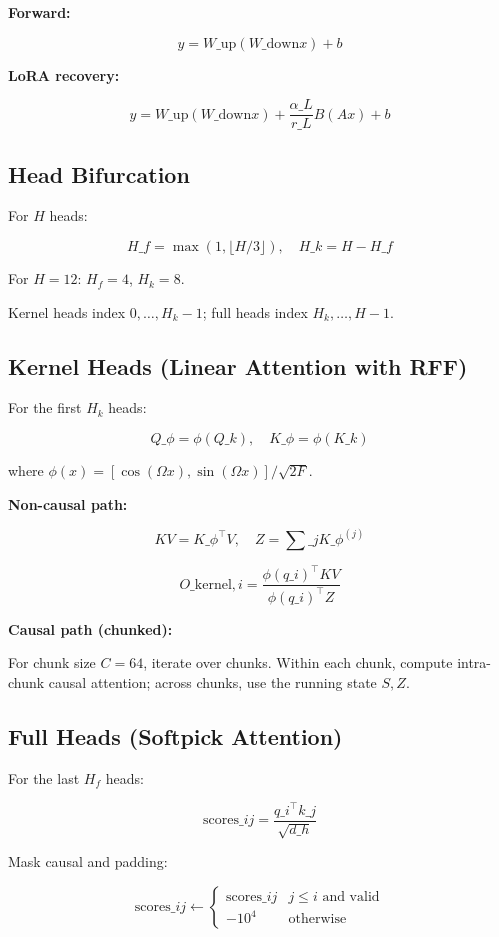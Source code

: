\textbf{Forward:}

\[
y = W\_\text{up}(W\_\text{down} x) + b
\tag{4.1}
\]

\textbf{LoRA recovery:}

\[
y = W\_\text{up}(W\_\text{down} x) + \frac{\alpha\_L}{r\_L} B(A x) + b
\tag{4.2}
\]

\subsection{Head Bifurcation}

For $H$ heads:

\[
H\_f = \max(1, \lfloor H / 3 \rfloor), \quad H\_k = H - H\_f
\tag{4.3}
\]

For $H = 12$: $H_f = 4$, $H_k = 8$.

Kernel heads index $0, \ldots, H_k - 1$; full heads index $H_k, \ldots, H - 1$.

\subsection{Kernel Heads (Linear Attention with RFF)}

For the first $H_k$ heads:

\[
Q\_\phi = \phi(Q\_k), \quad K\_\phi = \phi(K\_k)
\tag{4.4}
\]

where $\phi(x) = [\cos(\Omega x), \sin(\Omega x)] / \sqrt{2F}$.

\textbf{Non-causal path:}

\[
KV = K\_\phi^\top V, \quad Z = \sum\_j K\_\phi^{(j)}
\tag{4.5}
\]

\[
O\_{\text{kernel}, i} = \frac{\phi(q\_i)^\top KV}{\phi(q\_i)^\top Z}
\tag{4.6}
\]

\textbf{Causal path (chunked):}

For chunk size $C = 64$, iterate over chunks. Within each chunk, compute 
intra-chunk causal attention; across chunks, use the running state $S, Z$.

\subsection{Full Heads (Softpick Attention)}

For the last $H_f$ heads:

\[
\text{scores}\_{ij} = \frac{q\_i^\top k\_j}{\sqrt{d\_h}}
\tag{4.7}
\]

Mask causal and padding:

\[
\text{scores}\_{ij} \leftarrow \begin{cases} \text{scores}\_{ij} & j \leq i \text{ and valid} \\ -10^4 & \text{otherwise} \end{cases}
\tag{4.8}
\]

